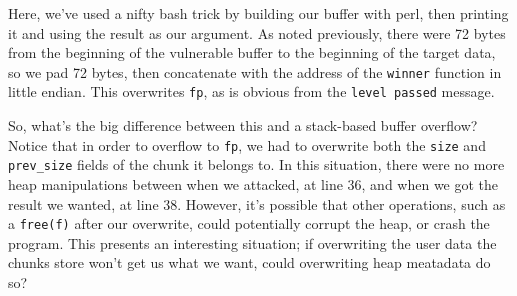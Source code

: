 Here, we've used a nifty bash trick by building our buffer with perl, then
printing it and using the result as our argument. As noted previously, there
were 72 bytes from the beginning of the vulnerable buffer to the beginning
of the target data, so we pad 72 bytes, then concatenate with the address
of the \texttt{winner} function in little endian. This overwrites \texttt{fp},
as is obvious from the \texttt{level passed} message.

So, what's the big difference between this and a stack-based buffer overflow?
Notice that in order to overflow to \texttt{fp}, we had to overwrite
both the \texttt{size} and \texttt{prev\_size} fields of the chunk
it belongs to. In this situation, there were no more heap manipulations
between when we attacked, at line 36, and when we got the result we
wanted, at line 38. However, it's possible that other operations, such
as a \texttt{free(f)} after our overwrite, could potentially corrupt the heap,
or crash the program. This presents an interesting situation; if overwriting
the user data the chunks store won't get us what we want, could overwriting
heap meatadata do so?
